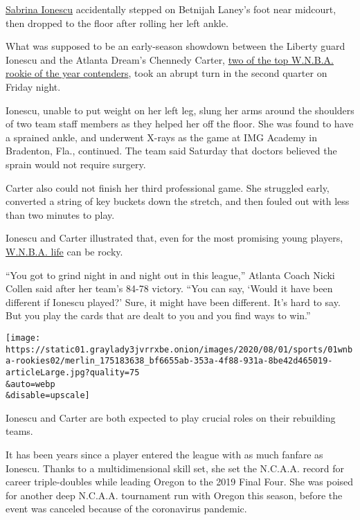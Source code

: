 \href{https://www.nytimes3xbfgragh.onion/2020/03/28/sports/sabrina-ionescu-oregon-wnba.html}{Sabrina
Ionescu} accidentally stepped on Betnijah Laney's foot near midcourt,
then dropped to the floor after rolling her left ankle.

What was supposed to be an early-season showdown between the Liberty
guard Ionescu and the Atlanta Dream's Chennedy Carter,
\href{https://www.nytimes3xbfgragh.onion/2020/07/24/sports/basketball/wnba-eastern-conference-preview.html}{two
of the top W.N.B.A. rookie of the year contenders}, took an abrupt turn
in the second quarter on Friday night.

Ionescu, unable to put weight on her left leg, slung her arms around the
shoulders of two team staff members as they helped her off the floor.
She was found to have a sprained ankle, and underwent X-rays as the game
at IMG Academy in Bradenton, Fla., continued. The team said Saturday
that doctors believed the sprain would not require surgery.

Carter also could not finish her third professional game. She struggled
early, converted a string of key buckets down the stretch, and then
fouled out with less than two minutes to play.

Ionescu and Carter illustrated that, even for the most promising young
players,
\href{https://www.nytimes3xbfgragh.onion/2020/07/23/sports/basketball/wnba-season-preview.html}{W.N.B.A.
life} can be rocky.

``You got to grind night in and night out in this league,'' Atlanta
Coach Nicki Collen said after her team's 84-78 victory. ``You can say,
`Would it have been different if Ionescu played?' Sure, it might have
been different. It's hard to say. But you play the cards that are dealt
to you and you find ways to win.''

\texttt{[image: https://static01.graylady3jvrrxbe.onion/images/2020/08/01/sports/01wnba-rookies02/merlin\_175183638\_bf6655ab-353a-4f88-931a-8be42d465019-articleLarge.jpg?quality=75\\\&auto=webp\\\&disable=upscale]}

Ionescu and Carter are both expected to play crucial roles on their
rebuilding teams.

It has been years since a player entered the league with as much fanfare
as Ionescu. Thanks to a multidimensional skill set, she set the N.C.A.A.
record for career triple-doubles while leading Oregon to the 2019 Final
Four. She was poised for another deep N.C.A.A. tournament run with
Oregon this season, before the event was canceled because of the
coronavirus pandemic.

